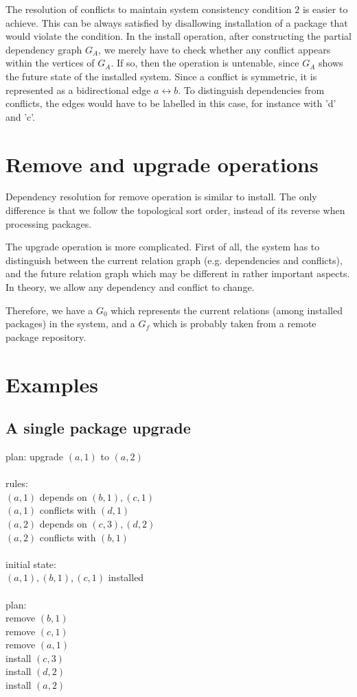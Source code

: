 \documentclass[a4paper,11pt]{article}
\begin{document}
The resolution of conflicts to maintain system consistency condition
$2$ is easier to achieve. This can be always satisfied by disallowing
installation of a package that would violate the condition. In the
install operation, after constructing the partial dependency graph
$G_A$, we merely have to check whether any conflict appears within the
vertices of $G_A$. If so, then the operation is untenable, since $G_A$
shows the future state of the installed system. Since a conflict is
symmetric, it is represented as a bidirectional edge $a \leftrightarrow b$. To
distinguish dependencies from conflicts, the edges would have to be
labelled in this case, for instance with 'd' and 'c'.

\section{Remove and upgrade operations}
 
Dependency resolution for remove operation is similar to install.  The
only difference is that we follow the topological sort order, instead
of its reverse when processing packages.

The upgrade operation is more complicated. First of all, the system
has to distinguish between the current relation graph
(e.g. dependencies and conflicts), and the future relation graph which
may be different in rather important aspects. In theory, we allow any
dependency and conflict to change.

Therefore, we have a $G_0$ which represents the current relations
(among installed packages) in the system, and a $G_f$ which is
probably taken from a remote package repository. 

\section{Examples}

\subsection{A single package upgrade}

plan: upgrade $(a,1)$ to $(a,2)$\\
\\
rules:\\
  $(a,1)$ depends on $(b,1), (c,1)$ \\
  $(a,1)$ conflicts with $(d,1)$\\
  $(a,2)$ depends on $(c,3), (d,2)$\\
  $(a,2)$ conflicts with $(b,1)$\\
\\
initial state:\\
  $(a,1), (b,1), (c,1)$ installed \\
\\
plan:\\
  remove $(b,1)$\\
  remove $(c,1)$\\
  remove $(a,1)$\\
  install $(c,3)$\\
  install $(d,2)$\\
  install $(a,2)$\\
\end{document}
